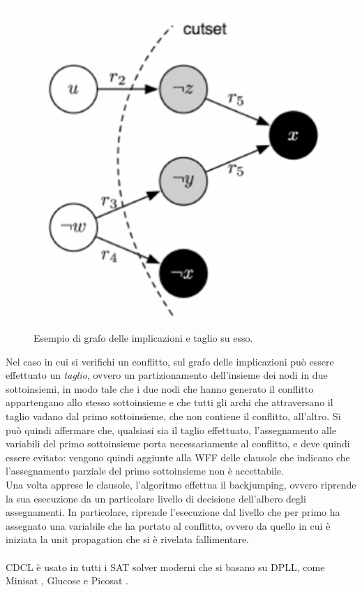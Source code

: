 \begin{figure}[H]
    \includegraphics[scale=0.15]{images/implication_graph.png}
    \centering
    \caption{Esempio di grafo delle implicazioni e taglio su esso. \cite{implication_graph}}
    \label{fig:implication_graph}
\end{figure}

Nel caso in cui si verifichi un conflitto, sul grafo delle implicazioni può essere effettuato 
un \textit{taglio}, ovvero un partizionamento dell'insieme dei nodi
in due sottoinsiemi, in modo tale che i due nodi che hanno generato il conflitto appartengano allo 
stesso sottoinsieme e che tutti gli archi che attraversano il taglio vadano dal primo
sottoinsieme, che non contiene il conflitto, all'altro.
Si può quindi affermare che, qualsiasi sia il taglio effettuato, l'assegnamento alle variabili
del primo sottoinsieme porta necessariamente al conflitto, e deve quindi essere evitato: vengono quindi aggiunte alla WFF delle clausole che indicano che l'assegnamento parziale del primo sottoinsieme non è accettabile.\\
Una volta apprese le clausole, l'algoritmo effettua il backjumping, ovvero riprende la sua esecuzione
da un particolare livello di decisione dell'albero degli assegnamenti. In particolare,
riprende l'esecuzione dal livello che per primo ha assegnato una variabile che ha portato al conflitto,
ovvero da quello in cui è iniziata la unit propagation che si è rivelata fallimentare.\\
\\
CDCL è usato in tutti i SAT solver moderni che si basano su DPLL, come Minisat 
\cite{minisat}, Glucose e Picosat \cite{picosat-site}.

